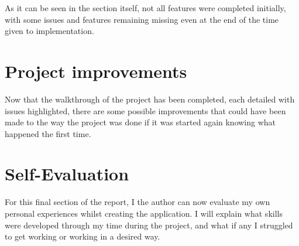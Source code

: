 As it can be seen in the section itself, not all features were completed initially, with some issues and features remaining missing even at the end of the time given to implementation.

\section{Project improvements}
Now that the walkthrough of the project has been completed, each detailed with issues highlighted, there are some possible improvements that could have been made to the way the project was done if it was started again knowing what happened the first time.

\section{Self-Evaluation}
For this final section of the report, I the author can now evaluate my own personal experiences whilst creating the application. I will explain what skills were developed through my time during the project, and what if any I struggled to get working or working in a desired way.



